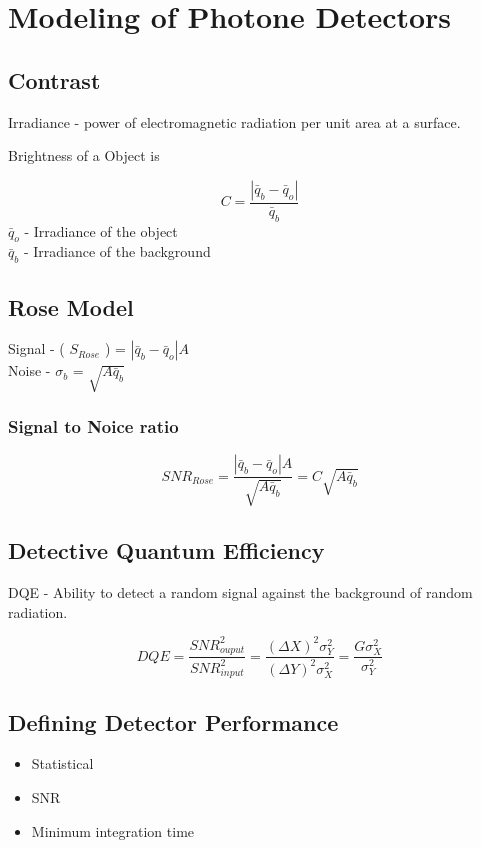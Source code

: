 \section{Modeling of Photone Detectors}
\subsection{Contrast}
 Irradiance - power of electromagnetic radiation per unit area at a surface.

 Brightness of a Object is

 \begin{equation*}
       C=\frac{|\bar q_{b} - \bar q_{o}|}{\bar q_{b}}
 \end{equation*}
 $\bar q_{o}$ - Irradiance of the object \\
 $\bar q_{b}$ - Irradiance of the background

\subsection{Rose Model}

{\color{red} Signal } - ( $S_{Rose}$ ) =  $|\bar q_{b} - \bar q_{o}|A$ \\
{\color{red} Noise } - $\sigma_{b}$ =  $\sqrt{A\bar q_{b}}$

\subsubsection{Signal to Noice ratio}
 \begin{equation*}
       SNR_{Rose} = \frac{|\bar q_{b} - \bar q_{o}|A}{\sqrt{A\bar q_{b}}}=C\sqrt{A\bar q_{b}}
 \end{equation*}
\subsection{Detective Quantum Efficiency} 

DQE -  Ability to detect a random signal against the background of random radiation.         

 \begin{equation*}
       DQE=\frac{SNR_{ouput}^{2}}{SNR_{input}^2}=\frac{(\Delta X)^{2}\sigma_{Y}^{2}}{(\Delta Y)^{2}\sigma_{X}^{2}}=\frac{G\sigma_{X}^{2}}{\sigma_{Y}^{2}}
 \end{equation*}

\subsection{Defining Detector Performance}
\begin{itemize}
     \item Statistical 
     \item SNR
     \item Minimum integration time
\end{itemize}


